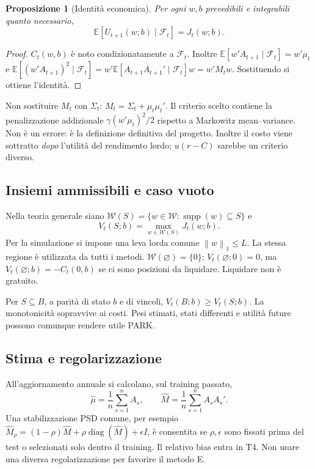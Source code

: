 \documentclass[11pt,a4paper]{article}
\newtheorem{proposition}[theorem]{Proposizione}
\theoremstyle{definition}\newtheorem{definition}[theorem]{Definizione}
\theoremstyle{remark}\newtheorem{remark}[theorem]{Osservazione}
\newcommand{\E}{\mathbb E}\newcommand{\PP}{\mathbb P}\newcommand{\R}{\mathbb R}
\newcommand{\F}{\mathcal F}\newcommand{\W}{\mathcal W}\newcommand{\supp}{\operatorname{supp}}
\newcommand{\norm}[1]{\left\lVert#1\right\rVert}\newcommand{\abs}[1]{\left|#1\right|}
\begin{document}
\begin{proposition}[Identità economica]
Per ogni $w,b$ prevedibili e integrabili quanto necessario,
\begin{equation}
 \E[U_{t+1}(w;b)\mid\F_t]=J_t(w;b).
\end{equation}
\end{proposition}
\begin{proof}
$C_t(w,b)$ è noto condizionatamente a $\F_t$. Inoltre $\E[w'A_{t+1}\mid\F_t]=w'\mu_t$ e
$\E[(w'A_{t+1})^2\mid\F_t]=w'\E[A_{t+1}A_{t+1}'\mid\F_t]w=w'M_tw$. Sostituendo si ottiene l'identità.
\end{proof}

Non sostituire $M_t$ con $\Sigma_t$: $M_t=\Sigma_t+\mu_t\mu_t'$. Il criterio scelto contiene la penalizzazione addizionale $\gamma(w'\mu_t)^2/2$ rispetto a Markowitz mean--variance. Non è un errore: è la definizione definitiva del progetto. Inoltre il costo viene sottratto \emph{dopo} l'utilità del rendimento lordo; $u(r-C)$ sarebbe un criterio diverso.

\subsection{Insiemi ammissibili e caso vuoto}
Nella teoria generale siano $\W(S)=\{w\in\W:\supp(w)\subseteq S\}$ e
\begin{equation}
 V_t(S;b)=\max_{w\in\W(S)}J_t(w;b).
\end{equation}
Per la simulazione si impone una leva lorda comune $\norm{w}_1\le L$. La stessa regione è utilizzata da tutti i metodi. $\W(\varnothing)=\{0\}$; $V_t(\varnothing;0)=0$, ma $V_t(\varnothing;b)=-C_t(0,b)$ se ci sono posizioni da liquidare. Liquidare non è gratuito.

Per $S\subseteq B$, a parità di stato $b$ e di vincoli, $V_t(B;b)\ge V_t(S;b)$. La monotonicità sopravvive ai costi. Pesi stimati, stati differenti e utilità future possono comunque rendere utile PARK.

\subsection{Stima e regolarizzazione}
All'aggiornamento annuale si calcolano, sul training passato,
\begin{equation}
 \widehat\mu=\frac1n\sum_{s=1}^n A_s,\qquad
 \widehat M=\frac1n\sum_{s=1}^n A_sA_s'.
\end{equation}
Una stabilizzazione PSD comune, per esempio $\widehat M_\rho=(1-\rho)\widehat M+\rho\operatorname{diag}(\widehat M)+\epsilon I$, è consentita se $\rho,\epsilon$ sono fissati prima del test o selezionati solo dentro il training. Il relativo bias entra in T4. Non usare una diversa regolarizzazione per favorire il metodo E.
\end{document}
